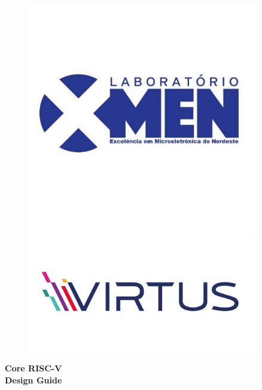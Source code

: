 \begin{titlepage}

\begin{figure}
\centering

\begin{minipage}{0.45\textwidth}
    \centering
    \includegraphics[width=0.9\textwidth]{images/logo.jpg}
\end{minipage}\hfill
\begin{minipage}{0.45\textwidth}
    \centering
    \includegraphics[width=0.9\textwidth]{images/logo_virtus.png}
\end{minipage}

\end{figure}

\vspace{8cm}
\parbox[t]{0.93\textwidth}{ 
\parbox[t]{0.91\textwidth}{
    \centering
    \fontsize{36pt}{40pt}\selectfont
    \vspace{3cm}
    
    \textbf{Core RISC-V \\
    Design Guide}
    
    \vspace{1.5cm}}
}
\end{titlepage}

